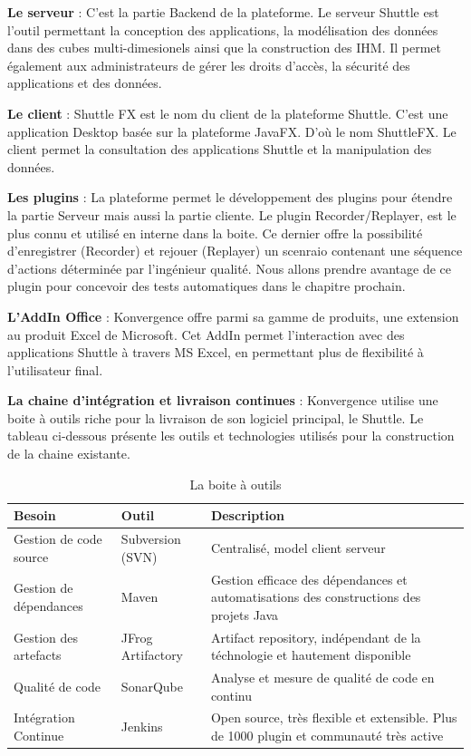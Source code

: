\begin{spacing}{1.2}
\FloatBarrier
\textbf {Le serveur} : C'est la partie Backend de la plateforme. Le serveur Shuttle est l'outil permettant la conception des applications, la modélisation des données dans des cubes multi-dimesionels ainsi que la construction des IHM. Il permet également aux administrateurs de gérer les droits d'accès, la sécurité des applications et des données. 

\textbf {Le client} : Shuttle FX est le nom du client de la plateforme Shuttle. C'est une application Desktop basée sur la plateforme JavaFX. D'où le nom ShuttleFX. Le client permet la consultation des applications Shuttle et la manipulation des données. 

\textbf {Les plugins} : La plateforme permet le développement des plugins pour étendre la partie Serveur mais aussi la partie cliente. Le plugin Recorder/Replayer, est le plus connu et utilisé en interne dans la boite. Ce dernier offre la possibilité d'enregistrer (Recorder) et rejouer (Replayer) un scenraio contenant une séquence d'actions déterminée par l'ingénieur qualité. Nous allons prendre avantage de ce plugin pour concevoir des tests automatiques dans le chapitre prochain.

\textbf{L'AddIn Office} : Konvergence offre parmi sa gamme de produits, une extension au produit Excel de Microsoft. Cet AddIn permet l'interaction avec des applications Shuttle à travers MS Excel, en permettant plus de flexibilité à l'utilisateur final. 

\textbf{La chaine d'intégration et livraison continues} : Konvergence utilise une boite à outils riche pour la livraison de son logiciel principal, le Shuttle. 
Le tableau ci-dessous présente les outils et technologies utilisés pour la construction de la chaine existante. 
\begin{table}[ht]
	\centering
	\caption{La boite à outils}
	\footnotesize
	\begin{tabularx}{\textwidth}{|p{3.3cm}|p{3.3cm}|X|}
          \hline
          {\textbf{Besoin}}
          & 
          {\textbf{Outil}} 
          & 
          {\textbf{Description}} 
          \\
          \hline
          Gestion de code source & Subversion (SVN) & Centralisé, model client serveur \\    \hline
          Gestion de dépendances & Maven  & Gestion efficace des dépendances et automatisations des constructions des projets Java \\    
          \hline
          Gestion des artefacts & JFrog Artifactory & Artifact repository, indépendant de la téchnologie et hautement disponible  \\          \hline
          Qualité de code & SonarQube & Analyse et mesure de qualité de code en continu \\          \hline
          Intégration Continue & Jenkins & Open source, très flexible et extensible. Plus de 1000 plugin et communauté très active \\          \hline
        \end{tabularx}
	\label{tab:exple}
\end{table}
\FloatBarrier


\end{spacing}
